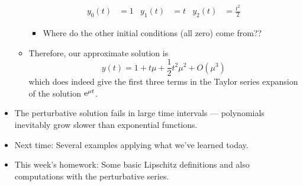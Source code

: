 \documentclass[../notes.tex]{subfiles}
\begin{document}
\begin{itemize}
\begin{itemize}
\begin{align*}
            y_0(t) &= 1&
            y_1(t) &= t&
            y_2(t) &= \frac{t^2}{2}
        \end{align*}
        \begin{itemize}
            \item Where do the other initial conditions (all zero) come from??
        \end{itemize}
        \item Therefore, our approximate solution is
        \begin{equation*}
            y(t) = 1+t\mu+\frac{1}{2}t^2\mu^2+O(\mu^3)
        \end{equation*}
        which does indeed give the first three terms in the Taylor series expansion of the solution $\e[\mu t]$.
    \end{itemize}
    \item The perturbative solution fails in large time intervals --- polynomials inevitably grow slower than exponential functions.
    \item Next time: Several examples applying what we've learned today.
    \item This week's homework: Some basic Lipschitz definitions and also computations with the perturbative series.
\end{itemize}
\end{document}
